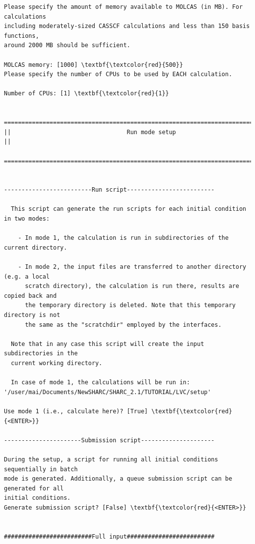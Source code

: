 \documentclass[a4paper,11pt,DIV=15,openany]{scrbook}
\begin{document}
\begin{oframed}
\begin{Verbatim}[commandchars=\\\{\}]
Please specify the amount of memory available to MOLCAS (in MB). For calculations 
including moderately-sized CASSCF calculations and less than 150 basis functions, 
around 2000 MB should be sufficient.

MOLCAS memory: [1000] \textbf{\textcolor{red}{500}}
Please specify the number of CPUs to be used by EACH calculation.

Number of CPUs: [1] \textbf{\textcolor{red}{1}}

  ================================================================================
||                                 Run mode setup                                 ||
  ================================================================================


-------------------------Run script-------------------------

  This script can generate the run scripts for each initial condition in two modes:

    - In mode 1, the calculation is run in subdirectories of the current directory.

    - In mode 2, the input files are transferred to another directory (e.g. a local
      scratch directory), the calculation is run there, results are copied back and
      the temporary directory is deleted. Note that this temporary directory is not
      the same as the "scratchdir" employed by the interfaces.

  Note that in any case this script will create the input subdirectories in the
  current working directory.

  In case of mode 1, the calculations will be run in:
'/user/mai/Documents/NewSHARC/SHARC_2.1/TUTORIAL/LVC/setup'

Use mode 1 (i.e., calculate here)? [True] \textbf{\textcolor{red}{<ENTER>}}

----------------------Submission script---------------------

During the setup, a script for running all initial conditions sequentially in batch
mode is generated. Additionally, a queue submission script can be generated for all
initial conditions.
Generate submission script? [False] \textbf{\textcolor{red}{<ENTER>}}


#########################Full input#########################


\end{Verbatim}
\end{oframed}
\end{document}
